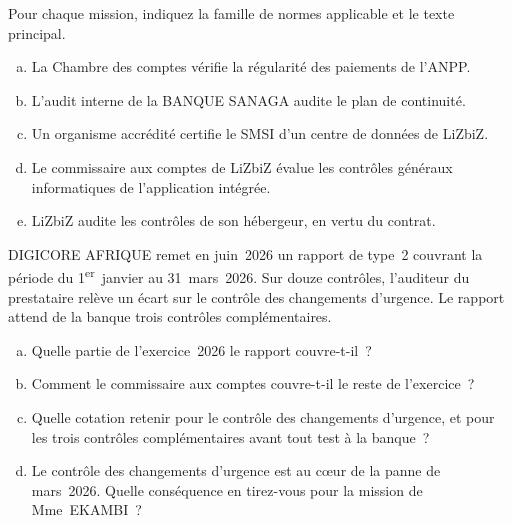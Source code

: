 \bigskip

\begin{boxexo}[title={\ding{45}\quad Exercice~10.1. Quelle norme~? \niveaubase}]
Pour chaque mission, indiquez la famille de normes applicable et le texte
principal.
\begin{enumerate}[(a)]
    \item La Chambre des comptes vérifie la régularité des paiements de
          l'ANPP.
    \item L'audit interne de la BANQUE SANAGA audite le plan de continuité.
    \item Un organisme accrédité certifie le SMSI d'un centre de données de
          LiZbiZ.
    \item Le commissaire aux comptes de LiZbiZ évalue les contrôles généraux
          informatiques de l'application intégrée.
    \item LiZbiZ audite les contrôles de son hébergeur, en vertu du contrat.
\end{enumerate}
\end{boxexo}

\begin{boxexo}[title={\ding{45}\quad Exercice~10.2. Lire un rapport ISAE 3402 \niveaumoyen}]
DIGICORE AFRIQUE remet en juin~2026 un rapport de type~2 couvrant la
période du 1\textsuperscript{er}~janvier au 31~mars~2026. Sur douze
contrôles, l'auditeur du prestataire relève un écart sur le contrôle des
changements d'urgence. Le rapport attend de la banque trois contrôles
complémentaires.
\begin{enumerate}[(a)]
    \item Quelle partie de l'exercice~2026 le rapport couvre-t-il~?
    \item Comment le commissaire aux comptes couvre-t-il le reste de
          l'exercice~?
    \item Quelle cotation retenir pour le contrôle des changements
          d'urgence, et pour les trois contrôles complémentaires avant tout
          test à la banque~?
    \item Le contrôle des changements d'urgence est au cœur de la panne de
          mars~2026. Quelle conséquence en tirez-vous pour la mission de
          Mme~EKAMBI~?
\end{enumerate}
\end{boxexo}

